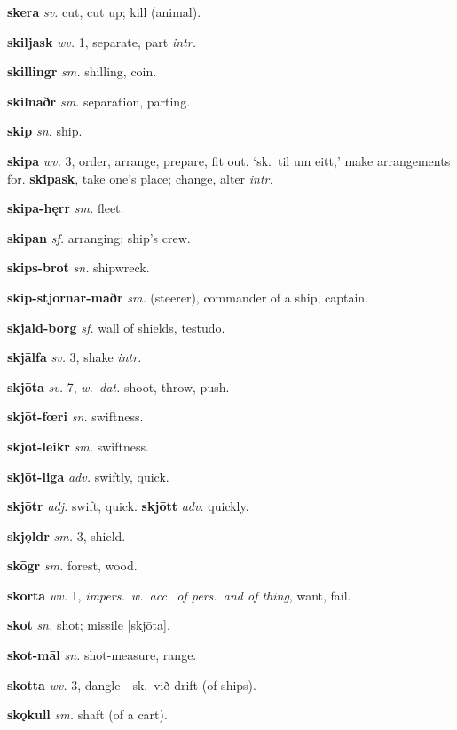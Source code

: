 \documentclass[12pt,letterpaper]{book}
\begin{document}
\noindent
\textbf{skera} \textit{sv.} cut, cut up; kill (animal).

\noindent
\textbf{skiljask} \textit{wv.} 1, separate, part \textit{intr.}

\noindent
\textbf{skillingr} \textit{sm.} shilling, coin.

\noindent
\textbf{skilnaðr} \textit{sm.} separation, parting.

\noindent
\textbf{skip} \textit{sn.} ship.

\noindent
\textbf{skipa} \textit{wv.} 3, order, arrange, prepare, fit out.
	`sk.\ til um eitt,' make arrangements for.  \textbf{skipask}, take
	one's place; change, alter \textit{intr.}

\noindent
\textbf{skipa-hęrr} \textit{sm.} fleet.

\noindent
\textbf{skipan} \textit{sf.} arranging; ship's crew.

\noindent
\textbf{skips-brot} \textit{sn.} shipwreck.

\noindent
\textbf{skip-stjōrnar-maðr} \textit{sm.} (steerer), commander of a ship,
    captain.

\noindent
\textbf{skjald-borg} \textit{sf.} wall of shields, testudo.

\noindent
\textbf{skjālfa} \textit{sv.} 3, shake \textit{intr.}

\noindent
\textbf{skjōta} \textit{sv.} 7, \textit{w.\ dat.} shoot, throw, push.

\noindent
\textbf{skjōt-fœri} \textit{sn.} swiftness.

\noindent
\textbf{skjōt-leikr} \textit{sm.} swiftness.

\noindent
\textbf{skjōt-liga} \textit{adv.} swiftly, quick.

\noindent
\textbf{skjōtr} \textit{adj.} swift, quick.  \textbf{skjōtt} \textit{adv.}
	quickly.

\noindent
\textbf{skjǫldr} \textit{sm.} 3, shield.

\noindent
\textbf{skōgr} \textit{sm.} forest, wood.

\noindent
\textbf{skorta} \textit{wv.} 1, \textit{impers.\ w.\ acc.\ of pers.\ and of
	thing}, want, fail.

\noindent
\textbf{skot} \textit{sn.} shot; missile [skjōta].

\noindent
\textbf{skot-māl} \textit{sn.} shot-measure, range.

\noindent
\textbf{skotta} \textit{wv.} 3, dangle---sk.\ við drift (of ships).

\noindent
\textbf{skǫkull} \textit{sm.} shaft (of a cart).
\end{document}
